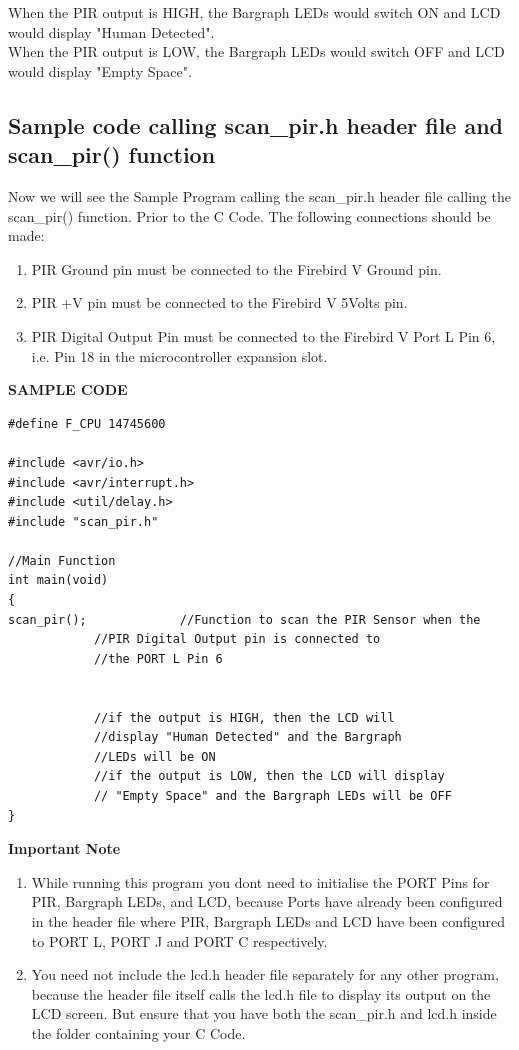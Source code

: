 \documentclass[a4paper,12 pt]{article}
\begin{document}
\vspace{5mm}\hspace{-8mm} When the PIR output is HIGH, the Bargraph LEDs would switch ON and LCD would display "Human Detected".\\
When the PIR output is LOW, the Bargraph LEDs would switch OFF and LCD would display "Empty Space".\\
\newpage
\subsection{Sample code calling scan\_pir.h header file and scan\_pir() function}
Now we will see the Sample Program calling the scan\_pir.h header file calling the scan\_pir() function. Prior to the C Code. The following connections should be made:
\begin{enumerate}
\item PIR Ground pin must be connected to the Firebird V Ground pin.
\item PIR +V pin must be connected to the Firebird V 5Volts pin.
\item PIR Digital Output Pin must be connected to the Firebird V Port L Pin 6, i.e. Pin 18 in the microcontroller expansion slot.
\end{enumerate}

\begin{center}

\LARGE{\textbf{SAMPLE CODE}}
\end{center}
\begin{verbatim}
#define F_CPU 14745600

#include <avr/io.h>
#include <avr/interrupt.h>
#include <util/delay.h>
#include "scan_pir.h"

//Main Function
int main(void)
{
scan_pir();				//Function to scan the PIR Sensor when the 
            //PIR Digital Output pin is connected to
            //the PORT L Pin 6


            //if the output is HIGH, then the LCD will 
            //display "Human Detected" and the Bargraph
            //LEDs will be ON
            //if the output is LOW, then the LCD will display
            // "Empty Space" and the Bargraph LEDs will be OFF
}

\end{verbatim}

\Large{\textbf{Important Note}}
\large
\begin{enumerate}
\item While running this program you dont need to initialise the PORT Pins for PIR, Bargraph LEDs, and LCD, because Ports have already been configured in the header file where PIR, Bargraph LEDs and LCD have been configured to PORT L, PORT J and PORT C respectively.
\item You need not include the lcd.h header file separately for any other program, because the header file itself calls the lcd.h file to display its output on the LCD screen. But ensure that you have both the scan\_pir.h and lcd.h inside the folder containing your C Code.
\end{enumerate}
\newpage
\end{document}
